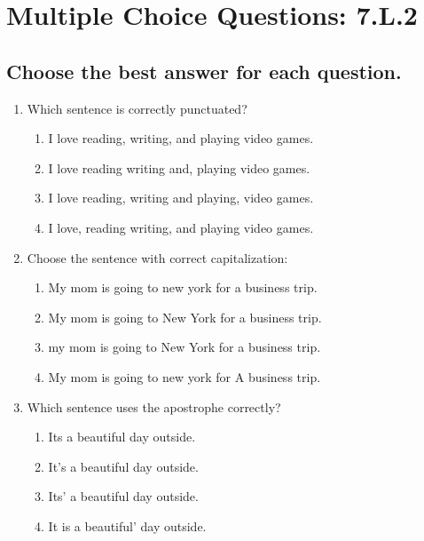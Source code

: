 \documentclass[12pt]{article}
\begin{document}
\onehalfspacing

\section*{Multiple Choice Questions: 7.L.2}

\subsection*{Choose the best answer for each question.}

\begin{enumerate}

\item Which sentence is correctly punctuated?
\begin{enumerate}[label=\Alph*.]
    \item I love reading, writing, and playing video games.
    \item I love reading writing and, playing video games.
    \item I love reading, writing and playing, video games.
    \item I love, reading writing, and playing video games.
\end{enumerate}

\vspace{0.5cm}

\item Choose the sentence with correct capitalization:
\begin{enumerate}[label=\Alph*.]
    \item My mom is going to new york for a business trip.
    \item My mom is going to New York for a business trip.
    \item my mom is going to New York for a business trip.
    \item My mom is going to new york for A business trip.
\end{enumerate}

\vspace{0.5cm}

\item Which sentence uses the apostrophe correctly?
\begin{enumerate}[label=\Alph*.]
    \item Its a beautiful day outside.
    \item It's a beautiful day outside.
    \item Its' a beautiful day outside.
    \item It is a beautiful' day outside.
\end{enumerate}


\end{enumerate}
\end{document}
